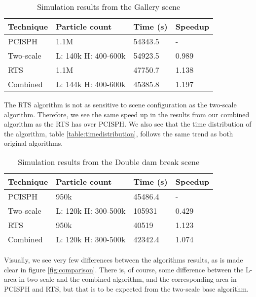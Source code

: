 \documentclass[../../main.tex]{subfiles}
\begin{document}
\begin{table}[]
\centering
\caption{Simulation results from the Gallery scene}
\label{table:gallery}
\begin{tabular}{llll}
\hline
Technique & Particle count      & Time (s) & Speedup \\ \hline
PCISPH    & 1.1M                & 54343.5  & -       \\
Two-scale & L: 140k H: 400-600k & 54923.5  & 0.989   \\
RTS       & 1.1M                & 47750.7  & 1.138   \\
Combined  & L: 144k H: 400-600k & 45385.8  & 1.197   \\ \hline
\end{tabular}
\end{table}


The RTS algorithm is not as sensitive to scene configuration as the two-scale algorithm. 
Therefore, we see the same speed up in the results from our combined algorithm as the RTS has over PCISPH. We also see that the time distribution of the algorithm, table \ref{table:timedistribution}, follows the same trend as both original algorithms. 

\begin{table}[]
\centering
\caption{Simulation results from the Double dam break scene}
\label{table:doubledam}
\begin{tabular}{llll}
\hline
Technique & Particle count      & Time (s) & Speedup \\ \hline
PCISPH    & 950k                & 45486.4  & -       \\
Two-scale & L: 120k H: 300-500k & 105931   & 0.429   \\
RTS       & 950k                & 40519    & 1.123   \\
Combined  & L: 120k H: 300-500k & 42342.4  & 1.074   \\ \hline
\end{tabular}
\end{table}

Visually, we see very few differences between the algorithms results, as is made clear in figure \ref{fig:comparison}. There is, of course, some difference between the L-area in two-scale and the combined algorithm, and the corresponding area in PCISPH and RTS, but that is to be expected from the two-scale base algorithm. 
\end{document}
